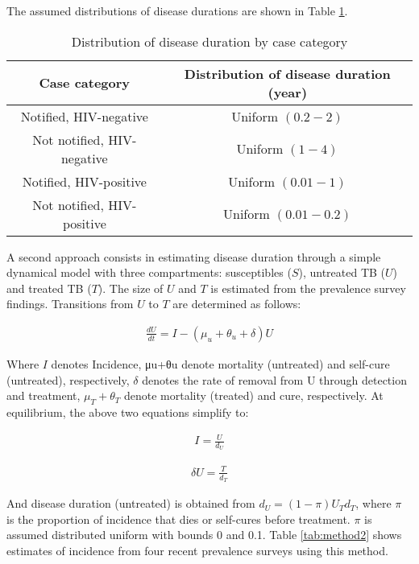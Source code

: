 The assumed distributions of disease durations are shown in Table \ref{tab:duration}.

\begin{table} 
    \label{tab:duration}
    \begin{tabular}{ c c }
        \hline
        Case category & Distribution of disease duration (year) \\ 
        \hline
        Notified, HIV-negative & Uniform $(0.2 - 2)$ \\ 
        Not notified, HIV-negative & Uniform $(1 - 4)$ \\ 
        Notified, HIV-positive & Uniform $(0.01 - 1)$ \\ 
        Not notified, HIV-positive & Uniform $(0.01 - 0.2)$ \\ 
        \hline
    \end{tabular} 
    \caption{Distribution of disease duration by case category} 
\end{table}



A second approach consists in estimating disease duration through a simple dynamical model with three compartments: susceptibles ($S$), untreated TB ($U$) and treated TB ($T$). The size of $U$ and $T$ is estimated from the prevalence survey findings. Transitions from $U$ to $T$ are determined as follows:

\begin{align*}
\frac{dU}{dt} = I - (\mu_u + \theta_u + \delta)U
\end{align*}

Where $I$ denotes Incidence, μu+θu denote mortality (untreated) and self-cure (untreated), respectively, $\delta$ denotes the rate of removal from U through detection and treatment, $\mu_T + \theta_T$ denote mortality (treated) and cure, respectively. At equilibrium, the above two equations simplify to: 

\begin{align*}
I = \frac{U}{d_U}
\end{align*}

\begin{align*}
\delta U = \frac{T}{d_T}
\end{align*}

And disease duration (untreated) is obtained from $d_U=(1-\pi)U_T d_T$, where $\pi$ is the proportion of incidence that dies or self-cures before treatment. $\pi$ is assumed distributed uniform with bounds 0 and 0.1. Table \ref{tab:method2} shows estimates of incidence from four recent prevalence surveys using this method. 

